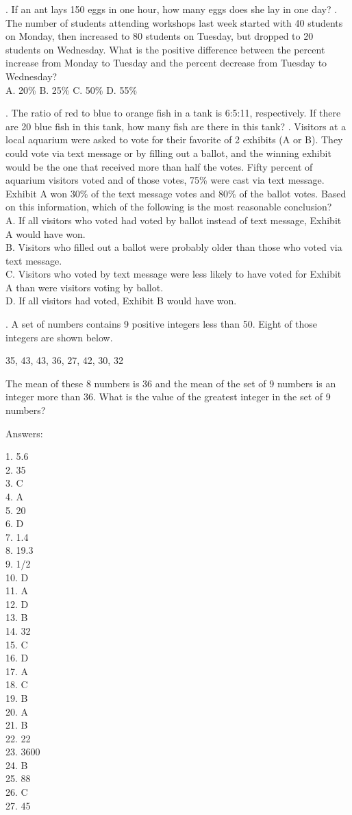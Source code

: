 \documentclass[../satmath.tex]{subfiles}
\begin{document}
. If an ant lays 150 eggs in one hour, how many eggs does she lay in one day?
. The number of students attending workshops last week started with 40 students on Monday, then increased to 80 students on Tuesday, but dropped to 
20 students on Wednesday. What is the positive difference between the percent increase from Monday to Tuesday and the percent decrease from Tuesday to Wednesday?\\
A. 20\% \quad B. 25\% \quad C. 50\% \quad D. 55\%

. The ratio of red to blue to orange fish in a tank is 6:5:11, respectively. If there are 20 blue fish in this tank, how many fish are there in this tank?
. Visitors at a local aquarium were asked to vote for their favorite of 2 exhibits (A or B). They could vote via text message or by filling out a ballot, 
and the winning exhibit would be the one that received more than half the votes. Fifty percent of aquarium visitors voted and of those votes, 75\% 
were cast via text message. Exhibit A won 30\% of the text message votes and 80\% of the ballot votes. Based on this information, which of the following is the most 
reasonable conclusion?\\
A. If all visitors who voted had voted by ballot instead of text message, Exhibit A would have won.\\
B. Visitors who filled out a ballot were probably older than those who voted via text message.\\
C. Visitors who voted by text message were less likely to have voted for Exhibit A than were visitors voting by ballot.\\
D. If all visitors had voted, Exhibit B would have won.

. A set of numbers contains 9 positive integers less than 50. Eight of those integers are shown below.
\begin{center}
    35, 43, 43, 36, 27, 42, 30, 32
\end{center}
The mean of these 8 numbers is 36 and the mean of the set of 9 numbers is an integer more than 36. What is the value of the greatest integer in the set of 9 numbers?

\medbreak
Answers:

1. 5.6\\
2. 35\\
3. C\\
4. A\\
5. 20\\
6. D\\
7. 1.4\\
8. 19.3\\
9. 1/2\\
10. D\\
11. A\\
12. D\\
13. B\\
14. 32\\
15. C\\
16. D\\
17. A\\
18. C\\
19. B\\
20. A\\
21. B\\
22. 22\\
23. 3600\\
24. B\\
25. 88\\
26. C\\
27. 45\\
\end{document}
